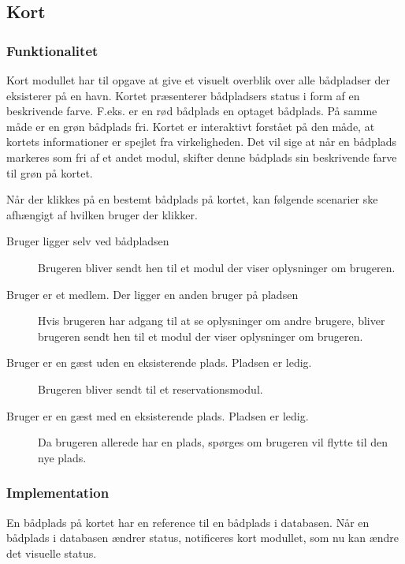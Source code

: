 \subsection{Kort}
\label{sub:kort}

\subsubsection{Funktionalitet}
\label{ssub:Funktionalitet}

Kort modullet har til opgave at give et visuelt overblik over alle bådpladser der eksisterer på en havn. Kortet præsenterer bådpladsers status i form af en beskrivende farve. F.eks. er en rød bådplads en optaget bådplads. På samme måde er en grøn bådplads fri. Kortet er interaktivt forstået på den måde, at kortets informationer er spejlet fra virkeligheden. Det vil sige at når en bådplads markeres som fri af et andet modul, skifter denne bådplads sin beskrivende farve til grøn på kortet.

Når der klikkes på en bestemt bådplads på kortet, kan følgende scenarier ske afhængigt af hvilken bruger der klikker.

\begin{description}
  \item[Bruger ligger selv ved bådpladsen] Brugeren bliver sendt hen til et modul der viser oplysninger om brugeren.
  \item[Bruger er et medlem. Der ligger en anden bruger på pladsen] Hvis brugeren har adgang til at se oplysninger om andre brugere, bliver brugeren sendt hen til et modul der viser oplysninger om brugeren.
  \item[Bruger er en gæst uden en eksisterende plads. Pladsen er ledig.] Brugeren bliver sendt til et reservationsmodul.
  \item[Bruger er en gæst med en eksisterende plads. Pladsen er ledig.] Da brugeren allerede har en plads, spørges om brugeren vil flytte til den nye plads.
\end{description}

\subsubsection{Implementation}
\label{ssub:Implementation}

En bådplads på kortet har en reference til en bådplads i databasen. Når en bådplads i databasen ændrer status, notificeres kort modullet, som nu kan ændre det visuelle status.
